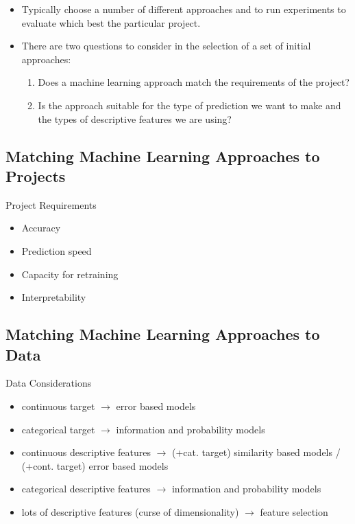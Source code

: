\documentclass[xcolor={table}]{beamer}
\begin{document}
\begin{frame}
	\begin{itemize}
		\item Typically choose a number of different approaches and to run experiments to evaluate which best the particular project. 
		\item There are two questions to consider in the selection of a set of initial approaches:
\begin{enumerate}
	\item Does a machine learning approach match the requirements of the project?
	\item Is the approach suitable for the type of prediction we want to make and the types of descriptive features we are using?
\end{enumerate}
	\end{itemize}
\end{frame}

\subsection{Matching Machine Learning Approaches to Projects}

\begin{frame}
	\begin{block}{Project Requirements}
		\begin{itemize}
			\item Accuracy
			\item Prediction speed
			\item Capacity for retraining
			\item Interpretability
		\end{itemize}
	\end{block}
\end{frame}

\subsection{Matching Machine Learning Approaches to Data}

\begin{frame}
	\begin{block}{Data Considerations}
		\begin{itemize}
			\item continuous target $\rightarrow$ error based models
			\item categorical target $\rightarrow$ information and probability models
			\item continuous descriptive features $\rightarrow$ (+cat. target) similarity based models / (+cont. target) error based models 
			\item categorical descriptive features $\rightarrow$ information and probability models
			\item lots of descriptive features (curse of dimensionality) $\rightarrow$ feature selection
		\end{itemize}
	\end{block}
\end{frame}
\end{document}
